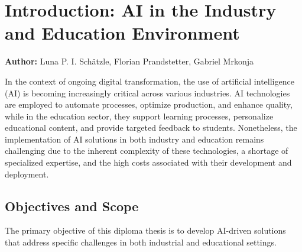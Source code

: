 \chapter{Introduction: AI in the Industry and Education Environment}
\label{chap:introduction}
\textbf{Author:} Luna P. I. Schätzle, Florian Prandstetter, Gabriel Mrkonja






In the context of ongoing digital transformation, the use of artificial intelligence (AI) is becoming increasingly critical across various industries. 
AI technologies are employed to automate processes, optimize production, and enhance quality, while in the education sector, they support learning processes, 
personalize educational content, and provide targeted feedback to students. Nonetheless, 
the implementation of AI solutions in both industry and education remains challenging due to the inherent complexity of these technologies, a shortage of specialized expertise, 
and the high costs associated with their development and deployment.

\section{Objectives and Scope}

The primary objective of this diploma thesis is to develop AI-driven solutions that address specific challenges in both industrial and educational settings.

